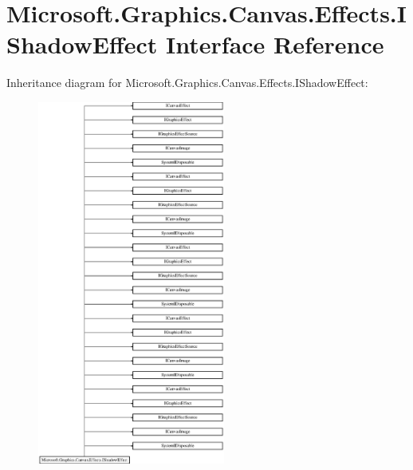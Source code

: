 \hypertarget{interface_microsoft_1_1_graphics_1_1_canvas_1_1_effects_1_1_i_shadow_effect}{}\section{Microsoft.\+Graphics.\+Canvas.\+Effects.\+I\+Shadow\+Effect Interface Reference}
\label{interface_microsoft_1_1_graphics_1_1_canvas_1_1_effects_1_1_i_shadow_effect}
Inheritance diagram for Microsoft.\+Graphics.\+Canvas.\+Effects.\+I\+Shadow\+Effect\+:\begin{figure}[H]
\begin{center}
\leavevmode
\includegraphics[height=12.000000cm]{interface_microsoft_1_1_graphics_1_1_canvas_1_1_effects_1_1_i_shadow_effect}
\end{center}
\end{figure}
